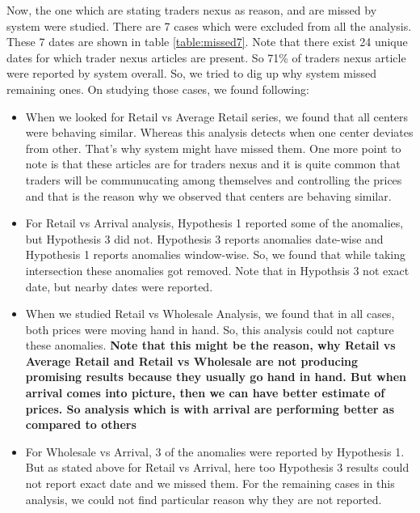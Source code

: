 \documentclass[a4paper,10pt]{article}
\begin{document}
Now, the one which are stating traders nexus as reason, and are missed by system were studied. There are 7 cases which were excluded from all the analysis. These 7 dates are shown in table \ref{table:missed7}. Note that there exist 24 unique dates for which trader nexus articles are present. So 71\% of traders nexus article were reported by system overall. So, we tried to dig up why system missed remaining ones. On studying those cases, we found following:

\begin{itemize}

	\item When we looked for Retail vs Average Retail series, we found that all centers were behaving similar. Whereas this analysis detects when one center deviates from other. That's why system might have missed them. One more point to note is that these articles are for traders nexus and it is quite common that traders will be communucating among themselves and controlling the prices and that is the reason why we observed that centers are behaving similar.
	
	\item For Retail vs Arrival analysis, Hypothesis 1 reported some of the anomalies, but Hypothesis 3 did not. Hypothesis 3 reports anomalies date-wise and Hypothesis 1 reports anomalies window-wise. So, we found that while taking intersection these anomalies got removed. Note that in Hypothsis 3 not exact date, but nearby dates were reported.
	
	\item When we studied Retail vs Wholesale Analysis, we found that in all cases, both prices were moving hand in hand. So, this analysis could not capture these anomalies. \textbf{ Note that this might be the reason, why Retail vs Average Retail and Retail vs Wholesale are not producing promising results because they usually go hand in hand. But when arrival comes into picture, then we can have better estimate of prices. So analysis which is with arrival are performing better as compared to others}
	
	\item For Wholesale vs Arrival, 3 of the anomalies were reported by Hypothesis 1. But as stated above for Retail vs Arrival, here too Hypothesis 3 results could not report exact date and we missed them. For the remaining cases in this analysis, we could not find particular reason why they are not reported.
	
\end{itemize}
\end{document}
